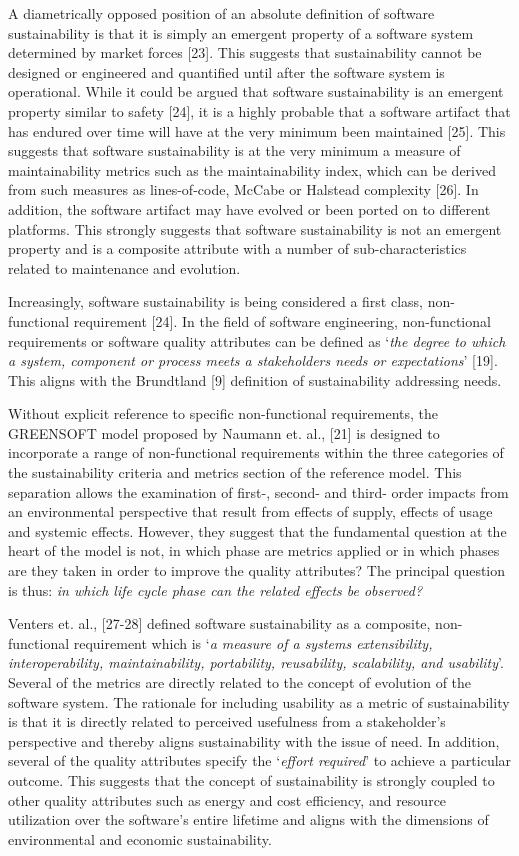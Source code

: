 \documentclass[preprint,12pt,authoryear]{elsarticle}
\begin{document}
A diametrically opposed position of an absolute definition of software
sustainability is that it is simply an emergent property of a software
system determined by market forces [23]. This suggests that
sustainability cannot be designed or engineered and quantified until
after the software system is operational. While it could be argued
that software sustainability is an emergent property similar to safety
[24], it is a highly probable that a software artifact that has
endured over time will have at the very minimum been maintained
[25]. This suggests that software sustainability is at the very
minimum a measure of maintainability metrics such as the
maintainability index, which can be derived from such measures as
lines-of-code, McCabe or Halstead complexity [26]. In addition, the
software artifact may have evolved or been ported on to different
platforms. This strongly suggests that software sustainability is not
an emergent property and is a composite attribute with a number of
sub-characteristics related to maintenance and evolution.

Increasingly, software sustainability is being considered a first
class, non-functional requirement [24]. In the field of software
engineering, non-functional requirements or software quality
attributes can be defined as `{\emph{the degree to which a system,
component or process meets a stakeholders needs or expectations}}'
[19]. This aligns with the Brundtland [9] definition of sustainability
addressing needs.

Without explicit reference to specific non-functional requirements,
the GREENSOFT model proposed by Naumann et. al., [21] is designed to
incorporate a range of non-functional requirements within the three
categories of the sustainability criteria and metrics section of the
reference model. This separation allows the examination of first-,
second- and third- order impacts from an environmental perspective
that result from effects of supply, effects of usage and systemic
effects. However, they suggest that the fundamental question at the
heart of the model is not, in which phase are metrics applied or in
which phases are they taken in order to improve the quality
attributes? The principal question is thus: {\emph{in which life cycle
phase can the related effects be observed?}}

Venters et. al., [27-28] defined software sustainability as a
composite, non-functional requirement which is `{\emph{a measure of a
systems extensibility, interoperability, maintainability, portability,
reusability, scalability, and usability}}'. Several of the metrics are
directly related to the concept of evolution of the software
system. The rationale for including usability as a metric of
sustainability is that it is directly related to perceived usefulness
from a stakeholder’s perspective and thereby aligns sustainability
with the issue of need. In addition, several of the quality attributes
specify the `{\emph{effort required}}' to achieve a particular
outcome. This suggests that the concept of sustainability is strongly
coupled to other quality attributes such as energy and cost
efficiency, and resource utilization over the software’s entire
lifetime and aligns with the dimensions of environmental and economic
sustainability.
\end{document}
